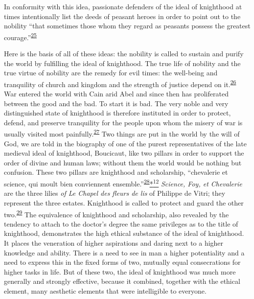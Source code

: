 In conformity with this idea, passionate defenders of the ideal of
knighthood at times intentionally list the deeds of peasant heroes in
order to point out to the nobility ``that sometimes those whom they
regard as peasants possess the greatest
courage.''\textsuperscript{\protect\hypertarget{10_Chapter_Three__THE_HEROIC_DREAM.xhtmlux5cux23id_1882}{\protect\hyperlink{23_NOTES.xhtmlux5cux23id_1883}{25}}}

\protect\hypertarget{10_Chapter_Three__THE_HEROIC_DREAM.xhtmlux5cux23page_70}{}{}Here
is the basis of all of these ideas: the nobility is called to sustain
and purify the world by fulfilling the ideal of knighthood. The true
life of nobility and the true virtue of nobility are the remedy for evil
times: the well-being and tranquility of church and kingdom and the
strength of justice depend on
it.\textsuperscript{\protect\hypertarget{10_Chapter_Three__THE_HEROIC_DREAM.xhtmlux5cux23id_1880}{\protect\hyperlink{23_NOTES.xhtmlux5cux23id_1881}{26}}}
War entered the world with Cain arid Abel and since then has
proliferated between the good and the bad. To start it is bad. The very
noble and very distinguished state of knighthood is therefore instituted
in order to protect, defend, and preserve tranquility for the people
upon whom the misery of war is usually visited most
painfully.\textsuperscript{\protect\hypertarget{10_Chapter_Three__THE_HEROIC_DREAM.xhtmlux5cux23id_1878}{\protect\hyperlink{23_NOTES.xhtmlux5cux23id_1879}{27}}}
Two things are put in the world by the will of God, we are told in the
biography of one of the purest representatives of the late medieval
ideal of knighthood, Boucicaut, like two pillars in order to support the
order of divine and human laws; without them the world would be nothing
but confusion. These two pillars are knighthood and scholarship,
``chevalerie et science, qui moult bien conviennent
ensemble.''\textsuperscript{\protect\hypertarget{10_Chapter_Three__THE_HEROIC_DREAM.xhtmlux5cux23id_1876}{\protect\hyperlink{23_NOTES.xhtmlux5cux23id_1877}{28}}}\protect\hypertarget{10_Chapter_Three__THE_HEROIC_DREAM.xhtmlux5cux23id_2485}{\protect\hyperlink{23_NOTES.xhtmlux5cux23id_2486}{*\textsuperscript{12}}}
\emph{Science, Foy, et Chevalerie} are the three lilies \emph{of Le
Chapel des fleurs de lis} of Philippe de Vitri; they represent the three
estates. Knighthood is called to protect and guard the other
two.\textsuperscript{\protect\hypertarget{10_Chapter_Three__THE_HEROIC_DREAM.xhtmlux5cux23id_1874}{\protect\hyperlink{23_NOTES.xhtmlux5cux23id_1875}{29}}}
The equivalence of knighthood and scholarship, also revealed by the
tendency to attach to the doctor's degree the same privileges as to the
title of knighthood, demonstrates the high ethical substance of the
ideal of knighthood. It places the veneration of higher aspirations and
daring next to a higher knowledge and ability. There is a need to see in
man a higher potentiality and a need to express this in the fixed forms
of two, mutually equal consecrations for higher tasks in life. But of
these two, the ideal of knighthood was much more generally and strongly
effective, because it combined, together with the ethical element, many
aesthetic elements that were intelligible to everyone.

